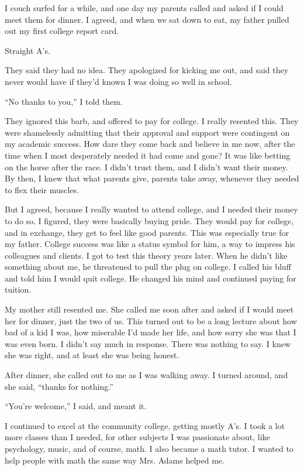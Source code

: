 I couch surfed for a while, and one day my parents called and asked if I could meet them for dinner. I agreed, and when we sat down to eat, my father pulled out my first college report card.

Straight A's.

They said they had no idea. They apologized for kicking me out, and said they never would have if they'd known I was doing so well in school.

``No thanks to you,'' I told them.

They ignored this barb, and offered to pay for college. I really resented this. They were shamelessly admitting that their approval and support were contingent on my academic success. How dare they come back and believe in me now, after the time when I most desperately needed it had come and gone? It was like betting on the horse after the race. I didn't trust them, and I didn't want their money. By then, I knew that what parents give, parents take away, whenever they needed to flex their muscles.

But I agreed, because I really wanted to attend college, and I needed their money to do so. I figured, they were basically buying pride. They would pay for college, and in exchange, they get to feel like good parents. This was especially true for my father. College success was like a status symbol for him, a way to impress his colleagues and clients. I got to test this theory years later. When he didn't like something about me, he threatened to pull the plug on college. I called his bluff and told him I would quit college. He changed his mind and continued paying for tuition.

My mother still resented me. She called me soon after and asked if I would meet her for dinner, just the two of us. This turned out to be a long lecture about how bad of a kid I was, how miserable I'd made her life, and how sorry she was that I was even born. I didn't say much in response. There was nothing to say. I knew she was right, and at least she was being honest.

After dinner, she called out to me as I was walking away. I turned around, and she said, ``thanks for nothing.''

``You're welcome,'' I said, and meant it.

I continued to excel at the community college, getting mostly A's. I took a lot more classes than I needed, for other subjects I was passionate about, like psychology, music, and of course, math. I also became a math tutor. I wanted to help people with math the same way Mrs. Adams helped me.

